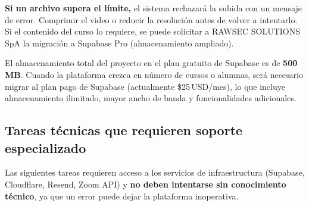 \documentclass[a4paper,11pt]{article}
\begin{document}
\begin{warnbox}
\textbf{Si un archivo supera el l\'imite,} el sistema rechazar\'a la subida con
un mensaje de error. Comprimir el video o reducir la resoluci\'on antes de volver
a intentarlo. Si el contenido del curso lo requiere, se puede solicitar a
RAWSEC SOLUTIONS SpA la migraci\'on a Supabase Pro (almacenamiento ampliado).
\end{warnbox}

El almacenamiento total del proyecto en el plan gratuito de Supabase es de
\textbf{500\,MB}. Cuando la plataforma crezca en n\'umero de cursos o alumnas,
ser\'a necesario migrar al plan pago de Supabase (actualmente \$25\,USD/mes),
lo que incluye almacenamiento ilimitado, mayor ancho de banda y funcionalidades
adicionales.

\subsection{Tareas t\'ecnicas que requieren soporte especializado}

Las siguientes tareas requieren acceso a los servicios de infraestructura
(Supabase, Cloudflare, Resend, Zoom API) y \textbf{no deben intentarse sin
conocimiento t\'ecnico}, ya que un error puede dejar la plataforma inoperativa.
\end{document}
